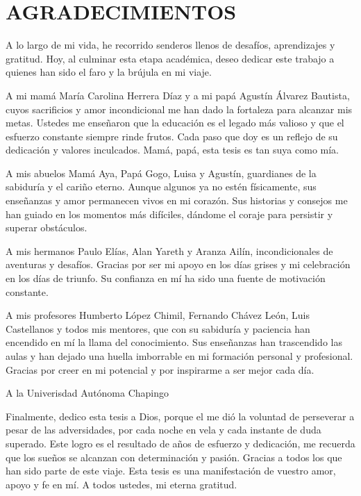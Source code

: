 


\chapter*{AGRADECIMIENTOS}
A lo largo de mi vida, he recorrido senderos llenos de desafíos, aprendizajes y gratitud. Hoy, al culminar esta etapa académica, deseo dedicar este trabajo a quienes han sido el faro y la brújula en mi viaje.

A mi mamá María Carolina Herrera Díaz y a mi papá Agustín Álvarez Bautista, cuyos sacrificios y amor incondicional me han dado la fortaleza para alcanzar mis metas. Ustedes me enseñaron que la educación es el legado más valioso y que el esfuerzo constante siempre rinde frutos. Cada paso que doy es un reflejo de su dedicación y valores inculcados. Mamá, papá, esta tesis es tan suya como mía.

A mis abuelos Mamá Aya, Papá Gogo, Luisa y Agustín, guardianes de la sabiduría y el cariño eterno. Aunque algunos ya no estén físicamente, sus enseñanzas y amor permanecen vivos en mi corazón. Sus historias y consejos me han guiado en los momentos más difíciles, dándome el coraje para persistir y superar obstáculos.

A mis hermanos Paulo Elías, Alan Yareth y Aranza Ailín, incondicionales de aventuras y desafíos. Gracias por ser mi apoyo en los días grises y mi celebración en los días de triunfo. Su confianza en mí ha sido una fuente de motivación constante.

A mis profesores Humberto López Chimil, Fernando Chávez León, Luis Castellanos y todos mis mentores, que con su sabiduría y paciencia han encendido en mí la llama del conocimiento. Sus enseñanzas han trascendido las aulas y han dejado una huella imborrable en mi formación personal y profesional. Gracias por creer en mi potencial y por inspirarme a ser mejor cada día.

A la Univerisdad Autónoma Chapingo

Finalmente, dedico esta tesis a Dios, porque el me dió la voluntad de perseverar a pesar de las adversidades, por cada noche en vela y cada instante de duda superado. Este logro es el resultado de años de esfuerzo y dedicación, me recuerda que los sueños se alcanzan con determinación y pasión. Gracias a todos los que han sido parte de este viaje. Esta tesis es una manifestación de vuestro amor, apoyo y fe en mí. A todos ustedes, mi eterna gratitud.